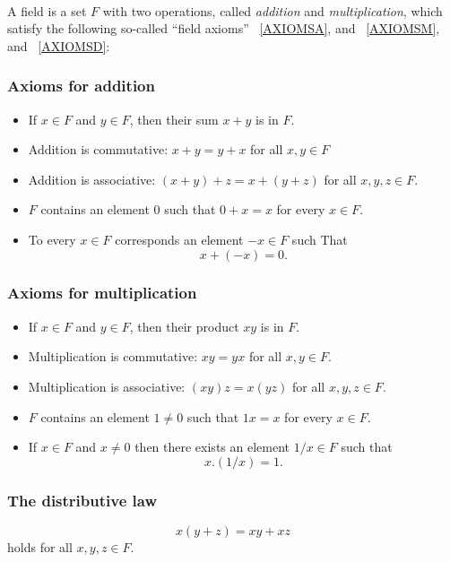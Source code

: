 ~\cite{ARTIN}

\begin{definition}
    A field is a set $F$ with two operations, called \textit{addition} and \textit{multiplication},
    which satisfy the following so-called ``field axioms'' ~\ref{AXIOMSA}, and ~\ref{AXIOMSM}, and ~\ref{AXIOMSD}:


\subsubsection*{\textbf{Axioms for addition}}
\label{AXIOMSA}
\begin{itemize}
    \item If $x \in F$ and $y \in F$, then their sum $x+y$ is in $F$.
    \item Addition is commutative: $x+y=y+x$ for all $x,y \in F$
    \item Addition is associative: $(x+y)+z=x+(y+z)$ for all $x,y,z \in F$.
    \item $F$ contains an element $0$ such that $0+x=x$ for every $x \in F$.
    \item To every $x \in F$ corresponds an element $-x \in F$ such That
        \begin{equation*}
            x+(-x)=0.
        \end{equation*} 
\end{itemize}
\subsubsection*{\textbf{Axioms for multiplication}}
\label{AXIOMSM}
\begin{itemize}
    \item If $x \in F$ and $y \in F$, then their product $xy$ is in $F$.
    \item Multiplication is commutative: $xy=yx$ for all $x,y \in F$.
    \item Multiplication is associative: $(xy)z=x(yz)$ for all $x,y,z \in F$.
    \item $F$ contains an element $1 \neq 0$ such that $1x=x$ for every $x \in F$.
    \item If $x \in F$ and $x \neq 0$ then there exists an element $1/x \in F$ such that
    \begin{equation*}
        x.(1/x)=1.
    \end{equation*}
\end{itemize}

\subsubsection*{\textbf{The distributive law}}
\label{AXIOMSD}

\begin{equation*}
    x(y+z)=xy+xz
\end{equation*}
holds for all $x,y,z \in F$.
\end{definition}


